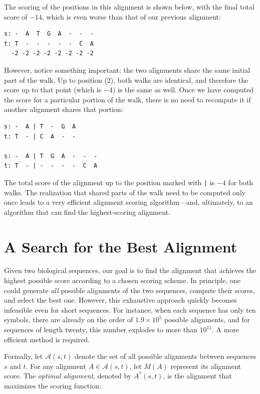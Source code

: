 The scoring of the positions in this alignment is shown below, with the final total score of $-14$, which is even worse than that of our previous alignment:

\begin{verbatim}
s: -  A  T  G  A  -  -  -
t: T  -  -  -  -  -  C  A
  -2 -2 -2 -2 -2 -2 -2 -2
\end{verbatim}

However, notice something important: the two alignments share the same initial part of the walk. Up to position (2), both walks are identical, and therefore the score up to that point (which is $-4$) is the same as well. Once we have computed the score for a particular portion of the walk, there is no need to recompute it if another alignment shares that portion:

\begin{verbatim}
s: -  A | T  -  G  A
t: T  - | C  A  -  -

s: -  A | T  G  A  -  -  -
t: T  - | -  -  -  -  C  A
\end{verbatim}

The total score of the alignment up to the position marked with {\tt |} is $-4$ for both walks. The realization that shared parts of the walk need to be computed only once leads to a very  efficient alignment scoring algorithm—and, ultimately, to an algorithm that can find the  highest-scoring alignment.

\section{A Search for the Best Alignment}

Given two biological sequences, our goal is to find the alignment that achieves the highest possible score according to a chosen scoring scheme. In principle, one could generate \emph{all} possible alignments of the two sequences, compute their scores, and select the best one. However, this exhaustive approach quickly becomes infeasible even for short sequences. For instance, when each sequence has only ten symbols, there are already on the order of $1.9\times 10^5$ possible alignments, and for sequences of length twenty, this number explodes to more than $10^{11}$. A more efficient method is required.

Formally, let $\mathcal{A}(s,t)$ denote the set of all possible alignments between sequences $s$ and $t$. 
For any alignment $A \in \mathcal{A}(s,t)$, let $M(A)$ represent its alignment score. 
The \emph{optimal alignment}, denoted by $A^*(s,t)$, is the alignment that maximizes the scoring function:

